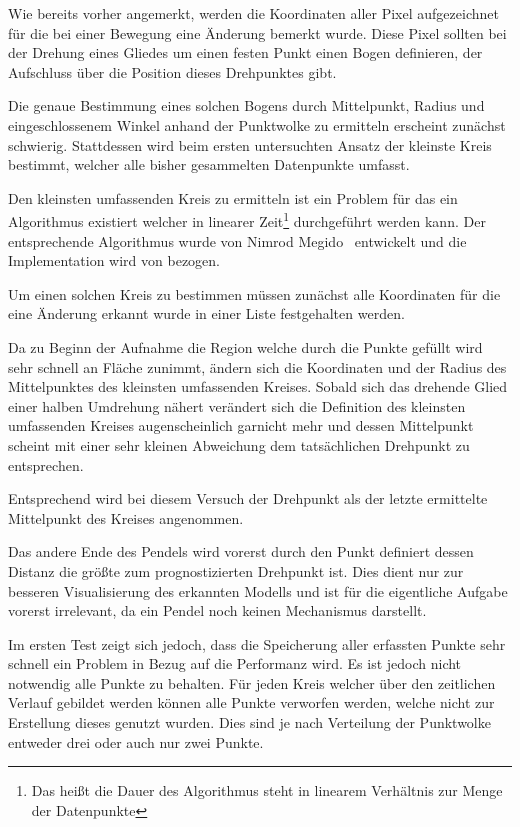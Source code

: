 Wie bereits vorher angemerkt, werden die Koordinaten aller Pixel aufgezeichnet für die bei einer Bewegung eine Änderung bemerkt wurde.
Diese Pixel sollten bei der Drehung eines Gliedes um einen festen Punkt einen Bogen definieren, der Aufschluss über die Position dieses Drehpunktes gibt.

Die genaue Bestimmung eines solchen Bogens durch Mittelpunkt, Radius und eingeschlossenem Winkel anhand der Punktwolke zu ermitteln erscheint zunächst schwierig.
Stattdessen wird beim ersten untersuchten Ansatz der kleinste Kreis bestimmt, welcher alle bisher gesammelten Datenpunkte umfasst.

Den kleinsten umfassenden Kreis zu ermitteln ist ein Problem für das ein Algorithmus existiert welcher in linearer Zeit\footnote{Das heißt die Dauer des Algorithmus steht in linearem Verhältnis zur Menge der Datenpunkte} durchgeführt werden kann.
Der entsprechende Algorithmus wurde von Nimrod Megido~\cite{Megiddo1983} entwickelt und die Implementation wird von  bezogen.


Um einen solchen Kreis zu bestimmen müssen zunächst alle Koordinaten für die eine Änderung erkannt wurde in einer Liste festgehalten werden.

Da zu Beginn der Aufnahme die Region welche durch die Punkte gefüllt wird sehr schnell an Fläche zunimmt, ändern sich die Koordinaten und der Radius des Mittelpunktes des kleinsten umfassenden Kreises.
Sobald sich das drehende Glied einer halben Umdrehung nähert verändert sich die Definition des kleinsten umfassenden Kreises augenscheinlich garnicht mehr und dessen Mittelpunkt scheint mit einer sehr kleinen Abweichung dem tatsächlichen Drehpunkt zu entsprechen.

Entsprechend wird bei diesem Versuch der Drehpunkt als der letzte ermittelte Mittelpunkt des Kreises angenommen.

Das andere Ende des Pendels wird vorerst durch den Punkt definiert dessen Distanz die größte zum prognostizierten Drehpunkt ist.
Dies dient nur zur besseren Visualisierung des erkannten Modells und ist für die eigentliche Aufgabe vorerst irrelevant, da ein Pendel noch keinen Mechanismus darstellt.

Im ersten Test zeigt sich jedoch, dass die Speicherung aller erfassten Punkte sehr schnell ein Problem in Bezug auf die Performanz wird.
Es ist jedoch nicht notwendig alle Punkte zu behalten.
Für jeden Kreis welcher über den zeitlichen Verlauf gebildet werden können alle Punkte verworfen werden, welche nicht zur Erstellung dieses genutzt wurden.
Dies sind je nach Verteilung der Punktwolke entweder drei oder auch nur zwei Punkte.

